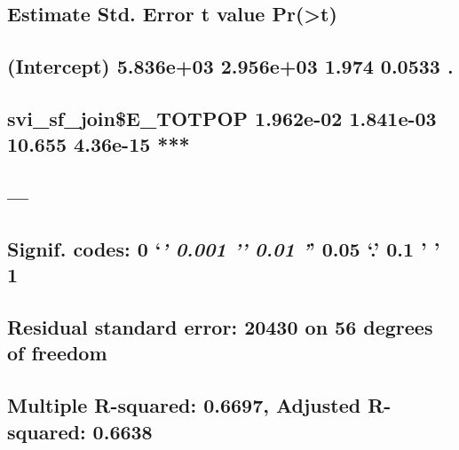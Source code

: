 \documentclass[
  12pt,
]{article}
\begin{document}
\hypertarget{estimate-std.-error-t-value-prt}{%
\subsection{Estimate Std. Error t value
Pr(\textgreater\textbar t\textbar)}\label{estimate-std.-error-t-value-prt}}

\hypertarget{intercept-5.836e03-2.956e03-1.974-0.0533-.}{%
\subsection{(Intercept) 5.836e+03 2.956e+03 1.974 0.0533
.}\label{intercept-5.836e03-2.956e03-1.974-0.0533-.}}

\hypertarget{svi_sf_joine_totpop-1.962e-02-1.841e-03-10.655-4.36e-15}{%
\subsection{svi\_sf\_join\$E\_TOTPOP 1.962e-02 1.841e-03 10.655 4.36e-15
***}\label{svi_sf_joine_totpop-1.962e-02-1.841e-03-10.655-4.36e-15}}

\hypertarget{section-8}{%
\subsection{---}\label{section-8}}

\hypertarget{signif.-codes-0-0.001-0.01-0.05-.-0.1-1}{%
\subsection{\texorpdfstring{Signif. codes: 0 `\emph{\textbf{' 0.001 '}'
0.01 '}' 0.05 `.' 0.1 ' '
1}{Signif. codes: 0 `\,' 0.001 '\,' 0.01 '\,' 0.05 `.' 0.1 ' ' 1}}\label{signif.-codes-0-0.001-0.01-0.05-.-0.1-1}}

\hypertarget{section-9}{%
\subsection{}\label{section-9}}

\hypertarget{residual-standard-error-20430-on-56-degrees-of-freedom}{%
\subsection{Residual standard error: 20430 on 56 degrees of
freedom}\label{residual-standard-error-20430-on-56-degrees-of-freedom}}

\hypertarget{multiple-r-squared-0.6697-adjusted-r-squared-0.6638}{%
\subsection{Multiple R-squared: 0.6697, Adjusted R-squared:
0.6638}\label{multiple-r-squared-0.6697-adjusted-r-squared-0.6638}}
\end{document}
